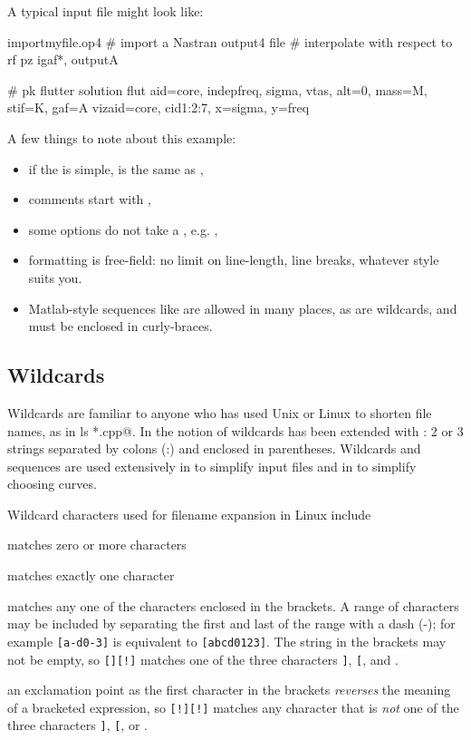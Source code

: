 A typical input file might look like:
\begin{example}
   import{myfile.op4}      # import a Nastran output4 file
   # interpolate with respect to rf
   pz {i{gaf*}, output{A} }

   # pk flutter solution
   flut{ aid=core, indep{freq, sigma, vtas},
         alt=0, mass=M, stif=K, gaf=A }
   viz{aid=core, cid{1:2:7}, x=sigma, y=freq}
\end{example}

A few things to note about this example:
\begin{itemize}
	\item if the  is simple,  is the
		same as ,
	\item comments start with \Spec{\#},
	\item some options do not take a , e.g. ,
	\item formatting is free-field: no limit on line-length, line breaks,
			whatever style suits you.
	\item Matlab-style sequences like  are allowed in many
		places, as are wildcards, and must be enclosed in curly-braces.
\end{itemize}

\subsection{Wildcards}\label{sect:wildcards}
Wildcards are familiar to anyone who has used Unix or Linux 
to shorten file names, as in \verb@ ls *.cpp@.
In \Flaps the notion of wildcards has been extended with
: 2 or 3 strings separated by colons (:) and
enclosed in parentheses.
Wildcards and sequences are used extensively in \Flaps to simplify
input files and in  to simplify choosing curves.

Wildcard characters used for filename expansion in Linux include
	\begin{description}
		\item{\Code{*}} matches zero or more characters
		\item{} matches exactly one character
		\item{\Code{[...]}} matches any one of the characters
			enclosed in the brackets. A range of characters may be included by
			separating the first and last of the range with a dash (-); for
			example \verb+[a-d0-3]+ is equivalent to \verb+[abcd0123]+.
			The string in the brackets may not be empty, so \verb+[][!]+ matches
			one of the three characters \verb+]+, \verb+[+, and \Code{!}.
		\item{\Code{[!...]}} an exclamation point as the first character in
			the brackets \emph{reverses} the meaning of a
			bracketed expression, so \verb+[!][!]+ matches any character that
			is \emph{not} one of the three characters \verb+]+, \verb+[+, or \Code{!}.
	\end{description}

